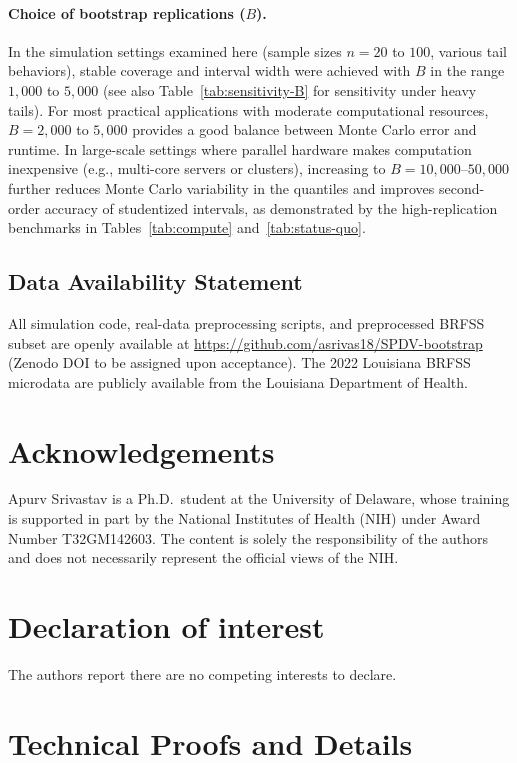 \documentclass[12pt,a4paper]{article}
\begin{document}
\paragraph{Choice of bootstrap replications ($B$).}
In the simulation settings examined here (sample sizes $n=20$ to $100$, various tail behaviors), stable coverage and interval width were achieved with $B$ in the range $1{,}000$ to $5{,}000$ (see also Table~\ref{tab:sensitivity-B} for sensitivity under heavy tails). For most practical applications with moderate computational resources, $B=2{,}000$ to $5{,}000$ provides a good balance between Monte Carlo error and runtime. In large-scale settings where parallel hardware makes computation inexpensive (e.g., multi-core servers or clusters), increasing to $B=10{,}000$--$50{,}000$ further reduces Monte Carlo variability in the quantiles and improves second-order accuracy of studentized intervals, as demonstrated by the high-replication benchmarks in Tables~\ref{tab:compute} and~\ref{tab:status-quo}.

\subsection*{Data Availability Statement}
All simulation code, real-data preprocessing scripts, and preprocessed BRFSS subset are openly available at \url{https://github.com/asrivas18/SPDV-bootstrap} (Zenodo DOI to be assigned upon acceptance). The 2022 Louisiana BRFSS microdata are publicly available from the Louisiana Department of Health.

\section*{Acknowledgements}
Apurv Srivastav is a Ph.D.\ student at the University of Delaware, whose training is supported in part by the National Institutes of Health (NIH) under Award Number T32GM142603. The content is solely the responsibility of the authors and does not necessarily represent the official views of the NIH.
\section*{Declaration of interest}
The authors report there are no competing interests to declare.


\appendix
\section{Technical Proofs and Details}
\end{document}
